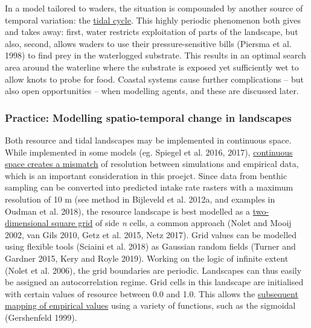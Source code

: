 \documentclass[]{scrartcl}
\begin{document}
\begin{linenumbers}
In a model tailored to waders, the situation is compounded by another
source of temporal variation: the \underline{tidal cycle}. This highly
periodic phenomenon both gives and takes away: first, water restricts
exploitation of parts of the landscape, but also, second, allows waders
to use their pressure-sensitive bills
(\protect\hypertarget{__UnoMark__4095_580056431}{}{}Piersma et al. 1998)
to find prey in the waterlogged substrate. This results in an optimal
search area around the waterline where the substrate is exposed yet
sufficiently wet to allow knots to probe for food. Coastal systems cause
further complications -- but also open opportunities -- when modelling
agents, and these are discussed later.

\subsubsection{Practice: Modelling spatio-temporal change in
landscapes}\label{practice-modelling-spatio-temporal-change-in-landscapes}

Both resource and tidal landscapes may be implemented in continuous
space. While implemented in some models (eg. Spiegel et al. 2016, 2017),
\underline{continuous space creates a mismatch} of resolution
between simulations and empirical data, which is an important
consideration in this proejct. Since data from benthic sampling can be
converted into predicted intake rate rasters with a maximum resolution
of 10 m (see method in
\protect\hypertarget{__UnoMark__44542_2549695377}{}{\protect\hypertarget{__UnoMark__53973_4107183634}{}{\protect\hypertarget{__UnoMark__2619_580056431}{}{\protect\hypertarget{ZOTERO_BREF_Ns4g4WsTk7Cb}{}{\protect\hypertarget{__UnoMark__39668_623588325}{}{}}}}}Bijleveld
et al. 2012a, and examples in Oudman et al. 2018), the resource
landscape is best modelled as a \underline{two-dimensional square grid} of
side \emph{n} cells, a common approach
(\protect\hypertarget{__UnoMark__4102_580056431}{}{}Nolet and Mooij
2002, van Gils 2010, Getz et al. 2015, Netz 2017). Grid values can be
modelled using flexible tools
(\protect\hypertarget{__UnoMark__4109_580056431}{}{}Sciaini et al. 2018)
as Gaussian random fields
(\protect\hypertarget{__UnoMark__4116_580056431}{}{}Turner and Gardner
2015, Kery and Royle 2019). Working on the logic of infinite extent
(\protect\hypertarget{__UnoMark__4123_580056431}{}{}Nolet et al. 2006),
the grid boundaries are periodic. Landscapes can thus easily be assigned
an autocorrelation regime. Grid cells in this landscape are initialised
with certain values of resource between 0.0 and 1.0. This allows the
\underline{subsequent mapping of empirical values} using a variety of
functions, such as the sigmoidal
(\protect\hypertarget{__UnoMark__4130_580056431}{}{}Gershenfeld 1999).


\end{linenumbers}
\end{document}

